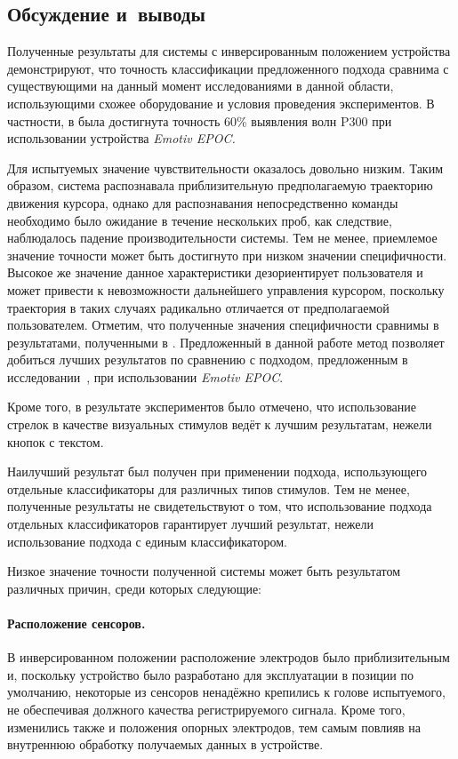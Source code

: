 \documentclass[12pt,a4paper,oneside,fleqn,leqno]{article}
\begin{document}
\subsection{Обсуждение и~выводы}
	\par Полученные результаты для системы с инверсированным положением устройства демонстрируют, что точность классификации предложенного подхода сравнима с существующими на данный момент исследованиями в данной области, использующими схожее оборудование и условия проведения экспериментов. В частности, в \cite{rhyme} была достигнута точность 60\% выявления волн P300 при использовании устройства {\it Emotiv EPOC.}
	\par Для испытуемых значение чувствительности оказалось довольно низким. Таким образом, система распознавала приблизительную предполагаемую траекторию движения курсора, однако для распознавания непосредственно команды необходимо было ожидание в течение нескольких проб, как следствие, наблюдалось падение производительности системы. Тем не менее, приемлемое значение точности может быть достигнуто при низком значении специфичности. Высокое же значение данное характеристики дезориентирует пользователя и может привести к невозможности дальнейшего управления курсором, поскольку траектория в таких случаях радикально отличается от предполагаемой пользователем. Отметим, что полученные значения специфичности сравнимы в результатами, полученными в \cite{Kanoh}. Предложенный в данной работе метод позволяет добиться лучших результатов по сравнению с подходом, предложенным в исследовании~\cite{pseudo}, при использовании {\it Emotiv EPOC}.
	\par Кроме того, в результате экспериментов было отмечено, что использование стрелок в качестве визуальных стимулов ведёт к лучшим результатам, нежели кнопок с текстом.
	\par Наилучший результат был получен при применении подхода, использующего отдельные классификаторы для различных типов стимулов. Тем не менее, полученные результаты не свидетельствуют о том, что использование подхода отдельных классификаторов гарантирует лучший результат, нежели использование подхода с единым классификатором.
	\par Низкое значение точности полученной системы может быть результатом различных причин, среди которых следующие:
	\paragraph{Расположение сенсоров.}
	\par В инверсированном положении расположение электродов было приблизительным и, поскольку устройство было разработано для эксплуатации в позиции по умолчанию, некоторые из сенсоров ненадёжно крепились к голове испытуемого, не обеспечивая должного качества регистрируемого сигнала. Кроме того, изменились также и положения опорных электродов, тем самым повлияв на внутреннюю обработку получаемых данных в устройстве.
\end{document}
